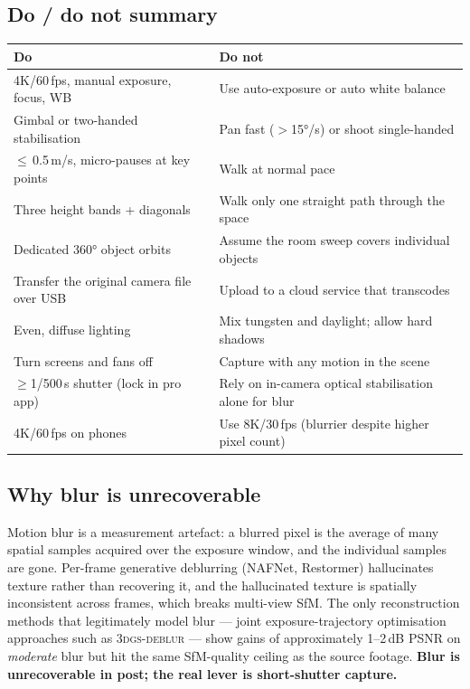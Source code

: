 \subsection{Do / do not summary}
\label{sec:pb-donot}

\begin{center}
\begin{tabular}{@{}L{5.8cm}L{7.2cm}@{}}
\toprule
\textbf{Do} & \textbf{Do not} \\
\midrule
4K/60\,fps, manual exposure, focus, WB & Use auto-exposure or auto white balance \\
Gimbal or two-handed stabilisation & Pan fast ($>$15°/s) or shoot single-handed \\
$\leq$\,0.5\,m/s, micro-pauses at key points & Walk at normal pace \\
Three height bands + diagonals & Walk only one straight path through the space \\
Dedicated 360° object orbits & Assume the room sweep covers individual objects \\
Transfer the original camera file over USB & Upload to a cloud service that transcodes \\
Even, diffuse lighting & Mix tungsten and daylight; allow hard shadows \\
Turn screens and fans off & Capture with any motion in the scene \\
$\geq$1/500\,s shutter (lock in pro app) & Rely on in-camera optical stabilisation alone for blur \\
4K/60\,fps on phones & Use 8K/30\,fps (blurrier despite higher pixel count) \\
\bottomrule
\end{tabular}
\end{center}

\subsection{Why blur is unrecoverable}
\label{sec:pb-blur-unrecoverable}

Motion blur is a measurement artefact: a blurred pixel is the average of many
spatial samples acquired over the exposure window, and the individual samples
are gone.  Per-frame generative deblurring (NAFNet, Restormer) hallucinates
texture rather than recovering it, and the hallucinated texture is spatially
inconsistent across frames, which breaks multi-view SfM.  The only
reconstruction methods that legitimately model blur --- joint exposure-trajectory
optimisation approaches such as \textsc{3dgs-deblur} --- show gains of
approximately 1--2\,dB PSNR on \emph{moderate} blur but hit the same
SfM-quality ceiling as the source footage.  \textbf{Blur is unrecoverable in
post; the real lever is short-shutter capture.}

